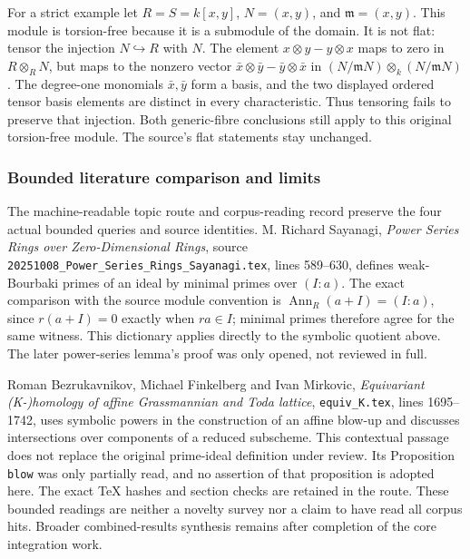For a strict example let \(R=S=k[x,y]\), \(N=(x,y)\), and \(\mathfrak m=(x,y)\). This module is torsion-free because it is a submodule of the domain. It is not flat: tensor the injection \(N\hookrightarrow R\) with \(N\). The element \(x\otimes y-y\otimes x\) maps to zero in \(R\otimes_RN\), but maps to the nonzero vector \(\bar x\otimes\bar y-\bar y\otimes\bar x\) in \((N/\mathfrak mN)\otimes_k(N/\mathfrak mN)\). The degree-one monomials \(\bar x,\bar y\) form a basis, and the two displayed ordered tensor basis elements are distinct in every characteristic. Thus tensoring fails to preserve that injection. Both generic-fibre conclusions still apply to this original torsion-free module. The source's flat statements stay unchanged.

\subsubsection{Bounded literature comparison and limits}\label{algebra-proof-005-bounded-literature-comparison-and-limits}

The machine-readable topic route and corpus-reading record preserve the four actual bounded queries and source identities. M. Richard Sayanagi, \emph{Power Series Rings over Zero-Dimensional Rings}, source \texttt{20251008\_Power\_Series\_Rings\_Sayanagi.tex}, lines 589--630, defines weak-Bourbaki primes of an ideal by minimal primes over \((I:a)\). The exact comparison with the source module convention is \(\operatorname{Ann}_R(a+I)=(I:a)\), since \(r(a+I)=0\) exactly when \(ra\in I\); minimal primes therefore agree for the same witness. This dictionary applies directly to the symbolic quotient above. The later power-series lemma's proof was only opened, not reviewed in full.

Roman Bezrukavnikov, Michael Finkelberg and Ivan Mirkovic, \emph{Equivariant (K-)homology of affine Grassmannian and Toda lattice}, \texttt{equiv\_K.tex}, lines 1695--1742, uses symbolic powers in the construction of an affine blow-up and discusses intersections over components of a reduced subscheme. This contextual passage does not replace the original prime-ideal definition under review. Its Proposition \texttt{blow} was only partially read, and no assertion of that proposition is adopted here. The exact TeX hashes and section checks are retained in the route. These bounded readings are neither a novelty survey nor a claim to have read all corpus hits. Broader combined-results synthesis remains after completion of the core integration work.

